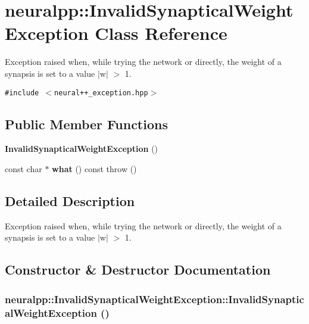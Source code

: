 \section{neuralpp::InvalidSynapticalWeightException Class Reference}
\label{classneuralpp_1_1InvalidSynapticalWeightException}
Exception raised when, while trying the network or directly, the weight of a synapsis is set to a value $|$w$|$ $>$ 1.  


{\tt \#include $<$neural++\_\-exception.hpp$>$}

\subsection*{Public Member Functions}
\begin{CompactItemize}
\item 
{\bf InvalidSynapticalWeightException} ()
\item 
const char $\ast$ {\bf what} () const   throw ()
\end{CompactItemize}


\subsection{Detailed Description}
Exception raised when, while trying the network or directly, the weight of a synapsis is set to a value $|$w$|$ $>$ 1. 

\subsection{Constructor \& Destructor Documentation}
\subsubsection[InvalidSynapticalWeightException]{\setlength{\rightskip}{0pt plus 5cm}neuralpp::InvalidSynapticalWeightException::InvalidSynapticalWeightException ()\hspace{0.3cm}{\tt  [inline]}}\label{classneuralpp_1_1InvalidSynapticalWeightException_42e54de0ef9d9f711a483287f4f95916}




